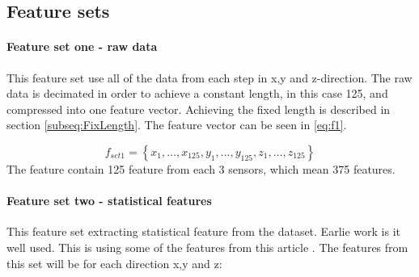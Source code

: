\documentclass[USenglish]{ifimaster}  %
\begin{document}

\subsection{Feature sets}\label{sec:featuresets}
\paragraph{Feature set one - raw data} This feature set use all of the data from each step in x,y and z-direction. The raw data is decimated in order to achieve a constant length, in this case 125, and compressed into one feature vector. Achieving the fixed length is described in section \ref{subseq:FixLength}. The feature vector can be seen in \ref{eq:f1}.

\begin{equation} \label{eq:f1}
f_{set1}= \left\{ x_1,\dotsc,x_{125},y_1, \dotsc,y_{125},z_1,\dotsc,z_{125} \right\}
\end{equation}
The feature contain 125 feature from each 3 sensors, which mean 375 features.


\paragraph{Feature set two - statistical features} This feature set extracting statistical feature from the dataset. Earlie work is it well used. This is using some of the features from this article \cite{Hoffmann20141790}. The features from this set will be for each direction x,y and z:
\end{document}
